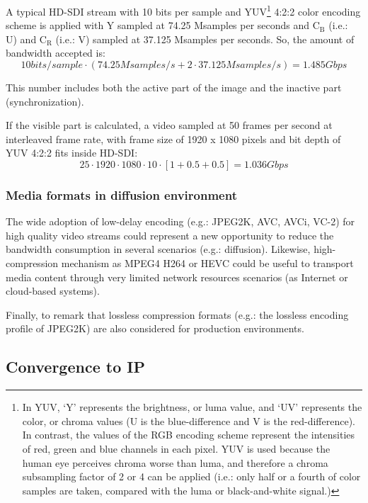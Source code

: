 A typical HD-SDI stream with 10 bits per sample and YUV\footnote{In YUV, ‘Y’ represents the brightness, or luma value, and ‘UV’ represents the color, or chroma values (U is the blue-difference and V is the red-difference). In contrast, the values of the RGB encoding scheme represent the intensities of red, green and blue channels in each pixel. YUV is used because the human eye perceives chroma worse than luma, and therefore a chroma subsampling factor of 2 or 4 can be applied (i.e.: only half or a fourth of color samples are taken, compared with the luma or black-and-white signal.)} 4:2:2 color encoding scheme is applied with Y sampled at 74.25 Msamples per seconds and $\mathrm{C_{B}}$ (i.e.: U) and $\mathrm{C_{R}}$ (i.e.: V) sampled at 37.125 Msamples per seconds.  So, the amount of bandwidth accepted is:
\begin{equation}\label{E:sr}
10 bits/sample \cdot (74.25 Msamples/s + 2 \cdot 37.125 Msamples/s) = 1.485 Gbps
\end{equation}

This number includes both the active part of the image and the inactive part (synchronization).

If the visible part is calculated, a video sampled at 50 frames per second at interleaved frame rate, with frame size of 1920 x 1080 pixels and bit depth of YUV 4:2:2 fits inside HD-SDI:
\begin{equation}\label{E:srex}
25 \cdot 1920 \cdot 1080 \cdot 10 \cdot [1 + 0.5 + 0.5] = 1.036 Gbps
\end{equation}

\subsubsection{Media formats in diffusion environment}

The wide adoption of low-delay encoding (e.g.: JPEG2K, AVC, AVCi, VC-2) for high quality video streams could represent a new opportunity to reduce the bandwidth consumption in several scenarios (e.g.: diffusion). Likewise, high-compression mechanism as MPEG4 H264 or HEVC could be useful to transport media content through very limited network resources scenarios (as Internet or cloud-based systems).

Finally, to remark that lossless compression formats (e.g.: the lossless encoding profile of JPEG2K) are also considered for production environments.

\subsection{Convergence to IP}

